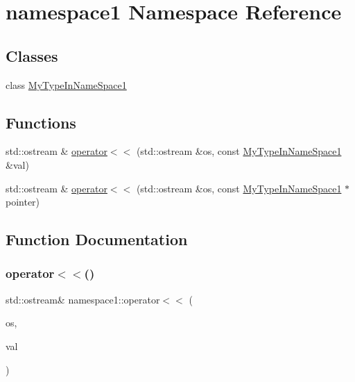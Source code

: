 \hypertarget{namespacenamespace1}{}\section{namespace1 Namespace Reference}
\label{namespacenamespace1}
\subsection*{Classes}
\begin{DoxyCompactItemize}
\item 
class \mbox{\hyperlink{classnamespace1_1_1MyTypeInNameSpace1}{My\+Type\+In\+Name\+Space1}}
\end{DoxyCompactItemize}
\subsection*{Functions}
\begin{DoxyCompactItemize}
\item 
std\+::ostream \& \mbox{\hyperlink{namespacenamespace1_acfbce4e68e4055891e9ca30f7d4cbf82}{operator$<$$<$}} (std\+::ostream \&os, const \mbox{\hyperlink{classnamespace1_1_1MyTypeInNameSpace1}{My\+Type\+In\+Name\+Space1}} \&val)
\item 
std\+::ostream \& \mbox{\hyperlink{namespacenamespace1_ac377ddc8113167c034b1e3d7a7c6262d}{operator$<$$<$}} (std\+::ostream \&os, const \mbox{\hyperlink{classnamespace1_1_1MyTypeInNameSpace1}{My\+Type\+In\+Name\+Space1}} $\ast$pointer)
\end{DoxyCompactItemize}


\subsection{Function Documentation}
\mbox{\label{namespacenamespace1_acfbce4e68e4055891e9ca30f7d4cbf82}} 
\subsubsection{\texorpdfstring{operator$<$$<$()}{operator<<()}\hspace{0.1cm}{\footnotesize\ttfamily [1/2]}}
{\footnotesize\ttfamily std\+::ostream\& namespace1\+::operator$<$$<$ (\begin{DoxyParamCaption}\item[{std\+::ostream \&}]{os,  }\item[{const \mbox{\hyperlink{classnamespace1_1_1MyTypeInNameSpace1}{My\+Type\+In\+Name\+Space1}} \&}]{val }\end{DoxyParamCaption})}

